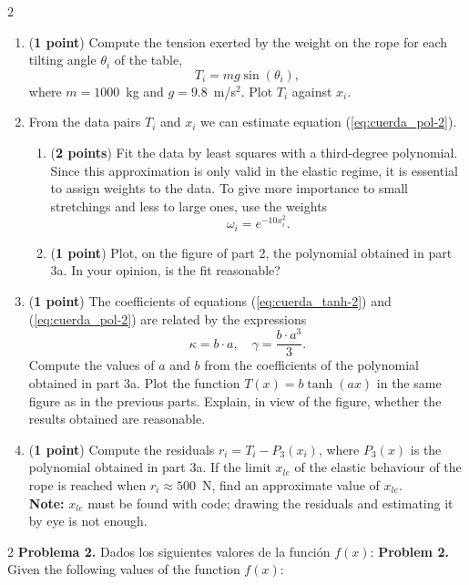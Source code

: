 \begin{paracol}{2}
\begin{enumerate}
	\item (\textbf{1 point}) Compute the tension exerted by the weight on the rope for each tilting angle $\theta_i$ of the table,
	 \begin{equation*}
	 	T_i = mg\sin(\theta_i),
	 \end{equation*}
	 where $m =1000$~kg and $g = 9.8$~m/s$^2$. Plot $T_i$ against $x_i$.
	 \item From the data pairs $T_i$ and $x_i$ we can estimate equation (\ref{eq:cuerda_pol-2}).
	 \begin{enumerate}
	 	\item (\textbf{2 points}) Fit the data by least squares with a third-degree polynomial. Since this approximation is only valid in the elastic regime, it is essential to assign weights to the data. To give more importance to small stretchings and less to large ones, use the weights
	 	\begin{equation*}
	 		\omega_i = e^{-10x_i^2}.
	 	\end{equation*}
	 	\item (\textbf{1 point}) Plot, on the figure of part 2, the polynomial obtained in part 3a. In your opinion, is the fit reasonable?
	 \end{enumerate}
	 \item (\textbf{1 point}) The coefficients of equations (\ref{eq:cuerda_tanh-2}) and (\ref{eq:cuerda_pol-2}) are related by the expressions
	 \begin{equation*}
	 	\kappa = b\cdot a, \quad \gamma = \frac{b\cdot a^3}{3}.
	 \end{equation*}
	 Compute the values of $a$ and $b$ from the coefficients of the polynomial obtained in part 3a. Plot the function $T(x) = b\tanh(ax)$ in the same figure as in the previous parts. Explain, in view of the figure, whether the results obtained are reasonable.
	 \item (\textbf{1 point}) Compute the residuals $r_i=T_i-P_3(x_i)$, where $P_3(x)$ is the polynomial obtained in part 3a. If the limit $x_{le}$ of the elastic behaviour of the rope is reached when $r_i \approx 500$~N, find an approximate value of $x_{le}$.\\
	 \textbf{Note:} $x_{le}$ must be found with code; drawing the residuals and estimating it by eye is not enough.
\end{enumerate}
\end{paracol}
\begin{paracol}{2}
\noindent \textbf{Problema 2.} Dados los siguientes valores de la función $f(x)$:
\switchcolumn
\noindent \textbf{Problem 2.} Given the following values of the function $f(x)$:
\end{paracol}

